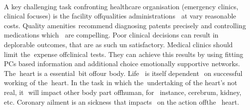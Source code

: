 \documentclass[oneside,12pt]{Classes/VTU}
\begin{document}
    \paragraph{}
    A key challenging task confronting healthcare organisation (emergency clinics, clinical focuses) is the facility of\tiny\textcolor{white}{f}\normalsize qualities administrations \tiny\textcolor{white}{b}\normalsize at vary reasonable costs. Quality amenities\tiny\textcolor{white}{e}\normalsize recommend diagnosing patents precisely and controlling medications which \tiny\textcolor{white}{b}\normalsize are compelling. Poor clinical\tiny\textcolor{white}{s}\normalsize decisions can result in deplorable\tiny\textcolor{white}{s}\normalsize outcomes, that are as such un satisfactory. Medical clinics should limit\tiny\textcolor{white}{s}\normalsize the\tiny\textcolor{white}{n}\normalsize expense of\tiny\textcolor{white}{f}\normalsize clinical\tiny\textcolor{white}{s}\normalsize tests. They can\tiny\textcolor{white}{t}\normalsize achieve this results by using fitting PCs based information and additional choice emotionally supportive\tiny\textcolor{white}{s}\normalsize networks. The\tiny\textcolor{white}{n}\normalsize heart is a essential\tiny\textcolor{white}{y}\normalsize bit of\tiny\textcolor{white}{f}\normalsize our\tiny\textcolor{white}{s}\normalsize body. Life \tiny\textcolor{white}{v}\normalsize is itself dependent \tiny\textcolor{white}{s}\normalsize on successful working of\tiny\textcolor{white}{s}\normalsize the\tiny\textcolor{white}{n}\normalsize heart. In the task\tiny\textcolor{white}{s}\normalsize in which the\tiny\textcolor{white}{n}\normalsize undertaking of the heart's not real, it\tiny\textcolor{white}{'s}\normalsize will impact other body part of\tiny\textcolor{white}{f}\normalsize human, for\tiny\textcolor{white}{m}\normalsize instance, cerebrum, kidney, etc. Coronary ailment is an sickness\tiny\textcolor{white}{s}\normalsize that impacts \tiny\textcolor{white}{c}\normalsize on the action of\tiny\textcolor{white}{f}\normalsize the\tiny\textcolor{white}{m}\normalsize heart.
\end{document}
